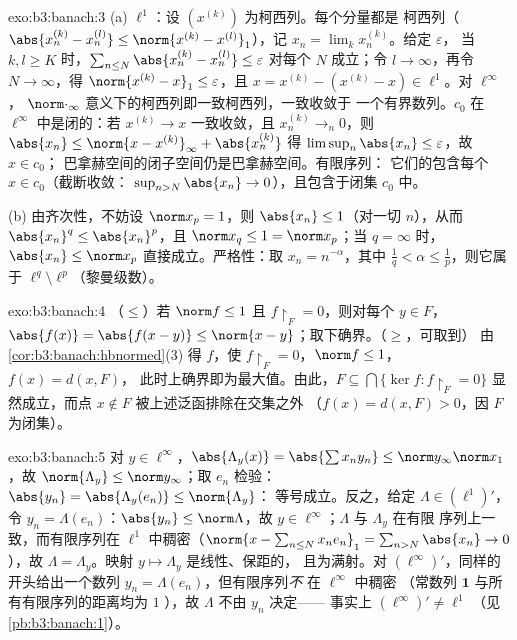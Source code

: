\begin{solution}{exo:b3:banach:3}
(a) $\ell^1$：设 $(x^{(k)})$ 为柯西列。每个分量都是
柯西列（$\abs{x^{(k)}_n - x^{(l)}_n} \leq \norm{x^{(k)} -
x^{(l)}}_1$），记 $x_n = \lim_kx^{(k)}_n$。给定 $\varepsilon$，
当 $k, l \geq K$ 时，$\sum_{n \leq N}\abs{x^{(k)}_n - x^{(l)}_n}
\leq \varepsilon$ 对每个 $N$ 成立；令 $l \to \infty$，再令 $N \to
\infty$，得 $\norm{x^{(k)} - x}_1 \leq \varepsilon$，且 $x =
x^{(k)} - (x^{(k)} - x) \in \ell^1$。对 $\ell^\infty$，
$\norm\cdot_\infty$ 意义下的柯西列即一致柯西列，一致收敛于
一个有界数列。$c_0$ 在 $\ell^\infty$ 中是闭的：若
$x^{(k)} \to x$ 一致收敛，且 $x^{(k)}_n \to_n 0$，则
$\abs{x_n} \leq \norm{x - x^{(k)}}_\infty + \abs{x^{(k)}_n}$
得 $\limsup_n\abs{x_n} \leq \varepsilon$，故 $x \in c_0$；
巴拿赫空间的闭子空间仍是巴拿赫空间。有限序列：
它们的包含每个 $x \in c_0$（截断收敛：
$\sup_{n>N}\abs{x_n} \to 0$），且包含于闭集
$c_0$ 中。

(b) 由齐次性，不妨设 $\norm x_p = 1$，则 $\abs{x_n} \leq
1$（对一切 $n$），从而 $\abs{x_n}^q \leq \abs{x_n}^p$，且 $\norm
x_q \leq 1 = \norm x_p$；当 $q = \infty$ 时，$\abs{x_n} \leq
\norm x_p$ 直接成立。严格性：取 $x_n = n^{-\alpha}$，其中
$\frac1q < \alpha \leq \frac1p$，则它属于 $\ell^q \setminus
\ell^p$（黎曼级数）。
\end{solution}

\begin{solution}{exo:b3:banach:4}
（$\leq$）若 $\norm f \leq 1$ 且 $f\restriction_F = 0$，则对每个 $y \in F$，
$\abs{f(x)} = \abs{f(x - y)} \leq \norm{x -
y}$；取下确界。（$\geq$，可取到）
由\cref{cor:b3:banach:hbnormed}(3) 得 $f$，使
$f\restriction_F = 0$，$\norm f \leq 1$，$f(x) = d(x, F)$，
此时上确界即为最大值。由此，$F \subseteq \bigcap\{\ker
f : f\restriction_F = 0\}$ 显然成立，而点 $x \notin F$
被上述泛函排除在交集之外
（$f(x) = d(x,F) > 0$，因 $F$ 为闭集）。
\end{solution}

\begin{solution}{exo:b3:banach:5}
对 $y \in \ell^\infty$，$\abs{\Lambda_y(x)} =
\abs{\sum x_ny_n} \leq \norm y_\infty\norm x_1$，故
$\norm{\Lambda_y} \leq \norm y_\infty$；取 $e_n$ 检验：
$\abs{y_n} = \abs{\Lambda_y(e_n)} \leq \norm{\Lambda_y}$：
等号成立。反之，给定 $\Lambda \in (\ell^1)'$，令 $y_n =
\Lambda(e_n)$：$\abs{y_n} \leq \norm\Lambda$，故 $y \in
\ell^\infty$；$\Lambda$ 与 $\Lambda_y$ 在有限
序列上一致，而有限序列在 $\ell^1$ 中稠密（$\norm{x - \sum_{n\leq
N}x_ne_n}_1 = \sum_{n>N}\abs{x_n} \to 0$），故 $\Lambda =
\Lambda_y$。映射 $y \mapsto \Lambda_y$ 是线性、保距的，
且为满射。对 $(\ell^\infty)'$，同样的开头给出一个数列
$y_n = \Lambda(e_n)$，但有限序列\emph{不}
在 $\ell^\infty$ 中稠密
（常数列 $\mathbf 1$ 与所有有限序列的距离均为 $1$
），故 $\Lambda$ 不由 $y_n$ 决定——
事实上 $(\ell^\infty)' \neq \ell^1$
（见\cref{pb:b3:banach:1}）。
\end{solution}

